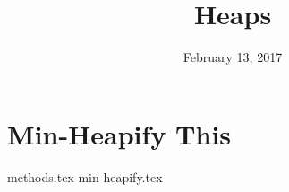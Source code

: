 \documentclass[11pt]{exam}
\title{Heaps}
\date{February 13, 2017}
\begin{document}
\maketitle

\section{Min-Heapify This}
\begin{questions}
{methods.tex}
{min-heapify.tex}
\end{questions}
\end{document}
